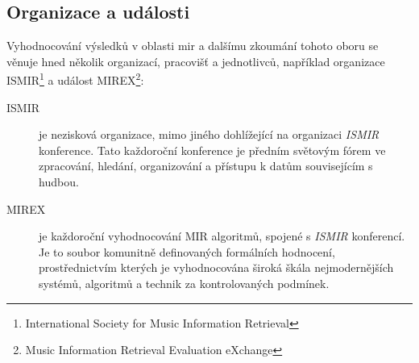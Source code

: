 \documentclass[thesis=B, czech]{FITthesis}[2019/03/06]
\begin{document}





\subsection*{Organizace a události}

Vyhodnocování výsledků v oblasti \gls{mir} a dalšímu zkoumání tohoto oboru se věnuje hned několik organizací, pracovišť a jednotlivců, například organizace ISMIR\footnote{International Society for Music Information Retrieval} a událost MIREX\footnote{Music Information Retrieval Evaluation eXchange}: 

\begin{description}
    \item [ISMIR] je nezisková organizace, mimo jiného dohlížející na organizaci \textit{\mbox{ISMIR}} konference. Tato každoroční konference je předním světovým fórem ve zpracování, hledání, organizování a přístupu k datům souvisejícím s hudbou.
    \item [MIREX] je každoroční vyhodnocování MIR algoritmů, spojené s \textit{ISMIR} konferencí. Je to soubor komunitně definovaných formálních hodnocení, prostřednictvím kterých je vyhodnocována široká škála nejmodernějších systémů, algoritmů a technik za kontrolovaných podmínek.
\end{description}
\end{document}
